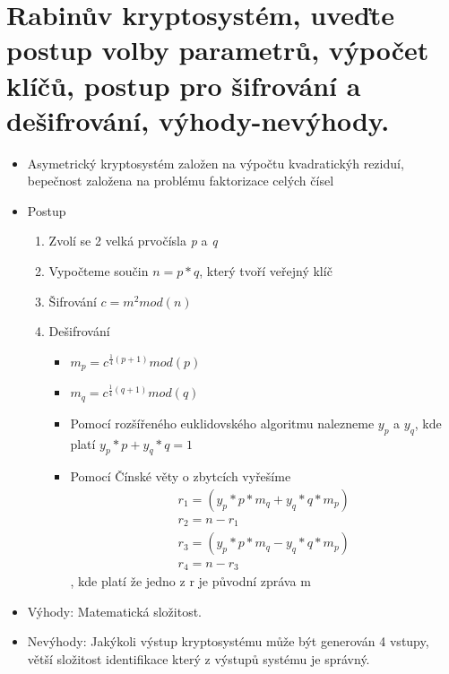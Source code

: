 \section{Rabinův kryptosystém, uveďte postup volby parametrů, výpočet klíčů, postup pro šifrování a dešifrování, výhody-nevýhody.}
\begin{itemize}
    \item Asymetrický kryptosystém založen na výpočtu kvadratickýh reziduí, bepečnost založena na problému faktorizace celých čísel
    \item Postup
    \begin{enumerate}
        \item Zvolí se 2 velká prvočísla \textit{p} a \textit{q}
        \item Vypočteme součin $n=p*q$, který tvoří veřejný klíč
        \item Šifrování  $c=m^2mod(n)$
        \item Dešifrování
        \begin{itemize}
            \item $m_p=c^{\frac{1}{4}(p+1)}mod(p)$
            \item $m_q=c^{\frac{1}{4}(q+1)}mod(q)$
            \item  Pomocí rozšířeného euklidovského algoritmu nalezneme $y_p $ a $y_q$, kde platí $y_p*p+y_q*q=1$
            \item Pomocí Čínské věty o zbytcích vyřešíme
            \begin{gather}
            r_1=(y_p*p*m_q+y_q*q*m_p) \\
            r_2=n-r_1 \\
            r_3=(y_p*p*m_q-y_q*q*m_p) \\
            r_4=n-r_3
            \end{gather}
            , kde platí že jedno z r je původní zpráva m
        \end{itemize}
    \end{enumerate}
    \item Výhody: Matematická složitost.
    \item Nevýhody: Jakýkoli výstup kryptosystému může být generován 4 vstupy, větší složitost identifikace který z výstupů systému je správný.
\end{itemize}

